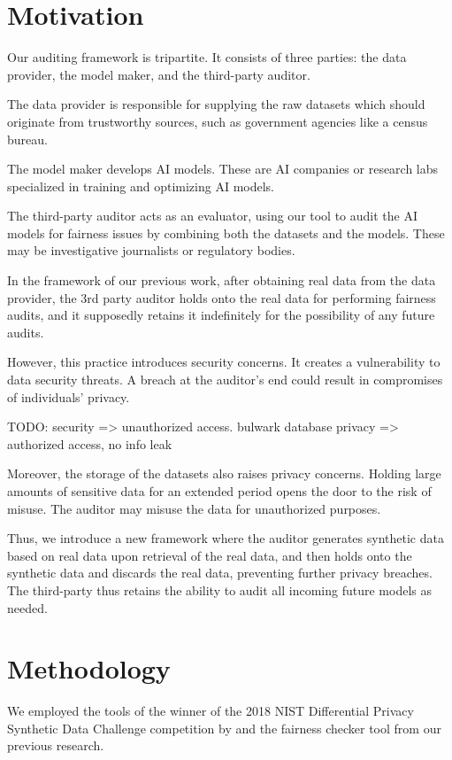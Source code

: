 \documentclass[manuscript,screen,review,anonymous]{acmart}
\begin{document}
\section{Motivation}

Our auditing framework is tripartite. It consists of three parties: the data provider, the model maker, and the third-party auditor.

The data provider is responsible for supplying the raw datasets which should originate from trustworthy sources, such as government agencies like a census bureau.

The model maker develops AI models. These are AI companies or research labs specialized in training and optimizing AI models.

The third-party auditor acts as an evaluator, using our tool to audit the AI models for fairness issues by combining both the datasets and the models. These may be investigative journalists or regulatory bodies.

In the framework of our previous work\cite{yuan2024ensuring}, after obtaining real data from the data provider, the 3rd party auditor holds onto the real data for performing fairness audits, and it supposedly retains it indefinitely for the possibility of any future audits.

However, this practice introduces security concerns. It creates a vulnerability to data security threats. A breach at the auditor's end could result in compromises of individuals' privacy.

TODO:
security => unauthorized access. bulwark database
privacy => authorized access, no info leak

Moreover, the storage of the datasets also raises privacy concerns. Holding large amounts of sensitive data for an extended period opens the door to the risk of misuse. The auditor may misuse the data for unauthorized purposes.

Thus, we introduce a new framework where the auditor generates synthetic data based on real data upon retrieval of the real data, and then holds onto the synthetic data and discards the real data, preventing further privacy breaches. The third-party thus retains the ability to audit all incoming future models as needed.

\section{Methodology}

We employed the tools of the winner of the 2018 NIST Differential Privacy Synthetic Data Challenge competition\cite{NIST2018} by \cite{McKenna_privatePGM,mckenna2021winning,mckenna2019graphical} and the fairness checker tool from our previous research\cite{yuan2024ensuring}.
\end{document}
